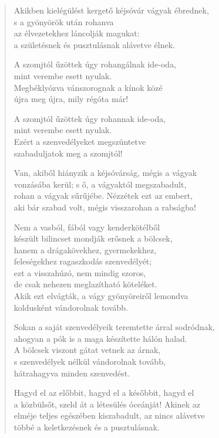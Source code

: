 \begin{verse}
 Akikben kielégülést kergető kéjsóvár vágyak ébrednek,\\
s a gyönyörök után rohanva\\
az élvezetekhez láncolják magukat:\\
a születésnek és pusztulásnak alávetve élnek.

 A szomjtól űzöttek úgy rohangálnak ide-oda,\\
mint verembe esett nyulak.\\
Megbéklyózva vánszorognak a kínok közé\\
újra meg újra, mily régóta már!

 A szomjtól űzöttek úgy rohannak ide-oda,\\
mint verembe esett nyulak.\\
Ezért a szenvedélyeket megszüntetve\\
szabaduljatok meg a szomjtól!

 Van, akiből hiányzik a kéjsóvárság, mégis a vágyak\\
vonzásába kerül; s ő, a vágyaktól megszabadult,\\
rohan a vágyak sűrűjébe. Nézzétek ezt az embert,\\
aki bár szabad volt, mégis visszarohan a rabságba!

  Nem a vasból, fából vagy kenderkötélből\\
készült bilincset mondják erősnek a bölcsek,\\
hanem a drágakövekhez, gyermekekhez,\\
feleségekhez ragaszkodás szenvedélyét;\\
ezt a visszahúzó, nem mindig szoros,\\
de csak nehezen meglazítható köteléket.\\
Akik ezt elvágták, a vágy gyönyöreiről lemondva\\
koldusként vándorolnak tovább.

 Sokan a saját szenvedélyeik teremtette árral sodródnak,\\
ahogyan a pók is a maga készítette hálón halad.\\
A bölcsek viszont gátat vetnek az árnak,\\
s szenvedélyek nélkül vándorolnak tovább,\\
hátrahagyva minden szenvedést.

 Hagyd el az előbbit, hagyd el a későbbit, hagyd el\\
a közbülsőt, szeld át a létesülés óceánját! Akinek az\\
elméje teljes egészében kiszabadult, az nincs alávetve\\
többé a keletkezésnek és a pusztulásnak.


\end{verse}
